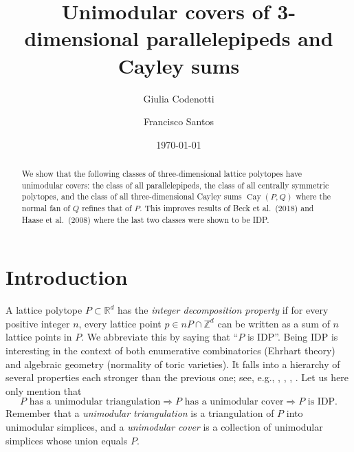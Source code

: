 \documentclass{amsart}
\date{\today}
\author[G.~Codenotti]{Giulia Codenotti}
\author[F.~Santos]{Francisco Santos}
\title{Unimodular covers of 3-dimensional parallelepipeds and Cayley sums}
\theoremstyle{plain}
\theoremstyle{definition}
\newcommand{\Z}{ \ensuremath{\mathbb{Z}}}
\newcommand{\R}{ \ensuremath{\mathbb{R}}}
\newcommand{\cayley}{\operatorname{Cay}}
\begin{document}
\begin{abstract}
We show that the following classes of three-dimensional lattice polytopes have unimodular covers: the class of all parallelepipeds, the class of all centrally symmetric polytopes, and the class of all three-dimensional Cayley sums $\cayley(P,Q)$ where the normal fan of $Q$ refines that of $P$. This improves results of Beck et al.~(2018) and Haase et al.~(2008) where the last two classes were shown to be IDP.
\end{abstract}

\maketitle

\tableofcontents

\section{Introduction}

A lattice polytope $P\subset \R^d$ has the \emph{integer decomposition property} if for every positive integer $n$, every lattice point $p \in nP\cap \Z^d$ can be written as a sum of $n$ lattice points in $P$. We abbreviate this by saying that ``$P$ is IDP''. Being IDP is interesting in the context of  both enumerative combinatorics (Ehrhart theory) and algebraic geometry (normality of toric varieties). It falls into a hierarchy of several properties each stronger than the previous one; see, e.g., \cite[Section 2.D]{BGbook}, \cite[Sect. 1.2.5]{HPPS-survey}, \cite[p. 2097]{mfo2004}, \cite[p. 2313]{mfo2007}.
Let us here only mention that
\[
P \text{ has a unimodular triangulation}\Rightarrow
P \text{ has a unimodular cover}\Rightarrow
P \text{ is IDP.}
\]
Remember that a \emph{unimodular triangulation} is a triangulation of $P$ into unimodular simplices, and a \emph{unimodular cover} is a collection of unimodular simplices whose union equals $P$. 
\end{document}
